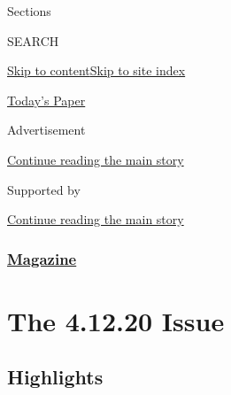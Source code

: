 Sections

SEARCH

\protect\hyperlink{site-content}{Skip to
content}\protect\hyperlink{site-index}{Skip to site index}

\href{https://myaccount.nytimes3xbfgragh.onion/auth/login?response_type=cookie\&client_id=vi}{}

\href{https://www.nytimes3xbfgragh.onion/section/todayspaper}{Today's
Paper}

Advertisement

\protect\hyperlink{after-top}{Continue reading the main story}

Supported by

\protect\hyperlink{after-sponsor}{Continue reading the main story}

\hypertarget{magazine}{%
\subsubsection{\texorpdfstring{\href{/section/magazine}{Magazine}}{Magazine}}\label{magazine}}

\hypertarget{the-41220-issue}{%
\section{The 4.12.20 Issue}\label{the-41220-issue}}

\hypertarget{highlights}{%
\subsection{Highlights}\label{highlights}}

